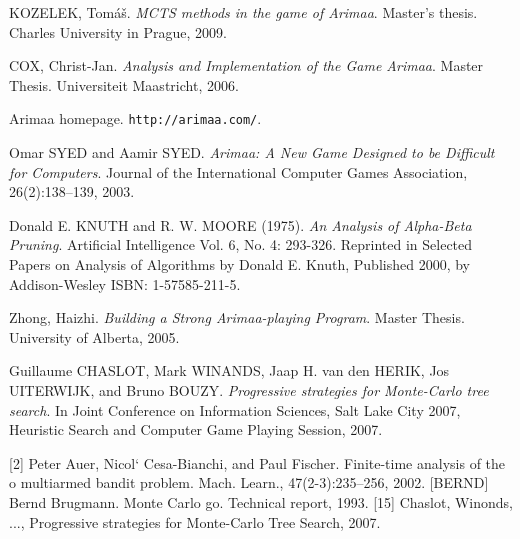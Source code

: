\def\bibname{Literature}
\begin{thebibliography}{99}
\addcontentsline{toc}{chapter}{\bibname}

	{\sc KOZELEK,} Tomáš.
	\emph{MCTS methods in the game of Arimaa}.
	Master's thesis.
	Charles University in Prague, 2009.

	{\sc COX,} Christ-Jan.
	\emph{Analysis and Implementation of the Game Arimaa}.
	Master Thesis.
	Universiteit Maastricht, 2006.

	Arimaa homepage.
	\texttt{http://arimaa.com/}.

	Omar {\sc SYED} and Aamir {\sc SYED}.
	\emph{Arimaa: A New Game Designed to be Difficult for Computers}.
	Journal of the International Computer Games Association, 26(2):138–139, 2003.

	Donald E. {\sc KNUTH} and R. W. {\sc MOORE} (1975).
	\emph{An Analysis of Alpha-Beta Pruning}.
	Artificial Intelligence Vol. 6, No. 4: 293-326. Reprinted in Selected Papers on Analysis of Algorithms by Donald E. Knuth, Published 2000, by Addison-Wesley
	ISBN: 1-57585-211-5.

	{\sc Zhong,} Haizhi.
	\emph{Building a Strong Arimaa-playing Program}.
	Master Thesis.
	University of Alberta, 2005.

	Guillaume {\sc CHASLOT}, Mark {\sc WINANDS}, Jaap H. van den {\sc HERIK},
	Jos {\sc UITERWIJK}, and Bruno {\sc BOUZY}.
	\emph{Progressive strategies for Monte-Carlo tree search}.
	In Joint Conference on Information Sciences, Salt Lake City 2007, Heuristic
	Search and Computer Game Playing Session, 2007.


\end{thebibliography}

[2] Peter Auer, Nicol` Cesa-Bianchi, and Paul Fischer. Finite-time analysis of
    the o multiarmed bandit problem. Mach. Learn., 47(2-3):235–256, 2002.
[BERND] Bernd Brugmann. Monte Carlo go. Technical report, 1993.
[15] Chaslot, Winonds, ..., Progressive strategies for Monte-Carlo Tree Search, 2007.
